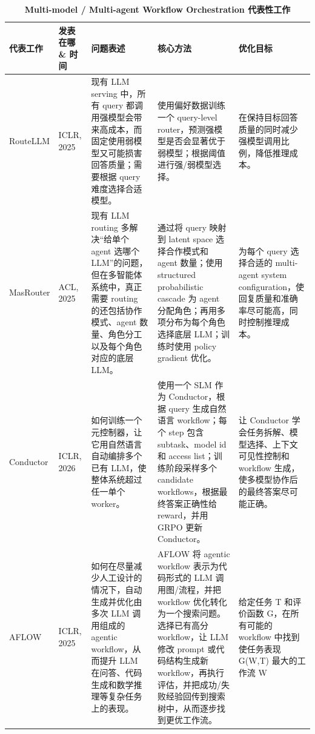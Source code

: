 \begin{table}[!htbp]
    \centering
    \caption{\textbf{Multi-model / Multi-agent Workflow Orchestration 代表性工作}}
    \label{tab:workflow-orchestration}
    \renewcommand{\arraystretch}{1.45}
    \scriptsize
    \setlength{\tabcolsep}{4pt}
    \begin{tabularx}{\textwidth}{@{}>{\hsize=0.75\hsize\raggedright\arraybackslash}X >{\hsize=0.75\hsize\raggedright\arraybackslash}X >{\hsize=1.15\hsize\raggedright\arraybackslash}X >{\hsize=1.15\hsize\raggedright\arraybackslash}X >{\hsize=1.20\hsize\raggedright\arraybackslash}X@{}}
        \toprule
        \textbf{代表工作} & \textbf{发表在哪 \& 时间} & \textbf{问题表述} & \textbf{核心方法} & \textbf{优化目标} \\
        \midrule
        RouteLLM \cite{ong2024routellm} & ICLR, 2025 & 现有 LLM serving 中，所有 query 都调用强模型会带来高成本，而固定使用弱模型又可能损害回答质量；需要根据 query 难度选择合适模型。 & 使用偏好数据训练一个 query-level router，预测强模型是否会显著优于弱模型；根据阈值进行强/弱模型选择。 & 在保持目标回答质量的同时减少强模型调用比例，降低推理成本。 \\
        \tabrowrule
        MasRouter \cite{yue2025masrouter} & ACL, 2025 & 现有 LLM routing 多解决“给单个 agent 选哪个 LLM”的问题，但在多智能体系统中，真正需要 routing 的还包括协作模式、agent 数量、角色分工以及每个角色对应的底层 LLM。 & 通过将 query 映射到 latent space 选择合作模式和 agent 数量；使用 structured probabilistic cascade 为 agent 分配角色；再用多项分布为每个角色选择底层 LLM；训练时使用 policy gradient 优化。 & 为每个 query 选择合适的 multi-agent system configuration，使回复质量和准确率尽可能高，同时控制推理成本。 \\
        \tabrowrule
        Conductor \cite{nielsen2025learning} & ICLR, 2026\newline  & 如何训练一个元控制器，让它用自然语言自动编排多个已有 LLM，使整体系统超过任一单个 worker。 & 使用一个 SLM 作为 Conductor，根据 query 生成自然语言 workflow；每个 step 包含 subtask、model id 和 access list；训练阶段采样多个 candidate workflows，根据最终答案正确性给 reward，并用 GRPO 更新 Conductor。 & 让 Conductor 学会任务拆解、模型选择、上下文可见性控制和 workflow 生成，使多模型协作后的最终答案尽可能正确。 \\
        \tabrowrule
        AFLOW \cite{zhang2025aflow} & ICLR, 2025 & 如何在尽量减少人工设计的情况下，自动生成并优化由多次 LLM 调用组成的 agentic workflow，从而提升 LLM 在问答、代码生成和数学推理等复杂任务上的表现。 & AFLOW 将 agentic workflow 表示为代码形式的 LLM 调用图/流程，并把 workflow 优化转化为一个搜索问题。选择已有高分 workflow，让 LLM 修改 prompt 或代码结构生成新 workflow，再执行评估，并把成功/失败经验回传到搜索树中，从而逐步找到更优工作流。 & 给定任务 T 和评价函数 G，在所有可能的 workflow 中找到使任务表现 G(W,T) 最大的工作流 W\newline  \\

\end{tabularx}
\end{table}
